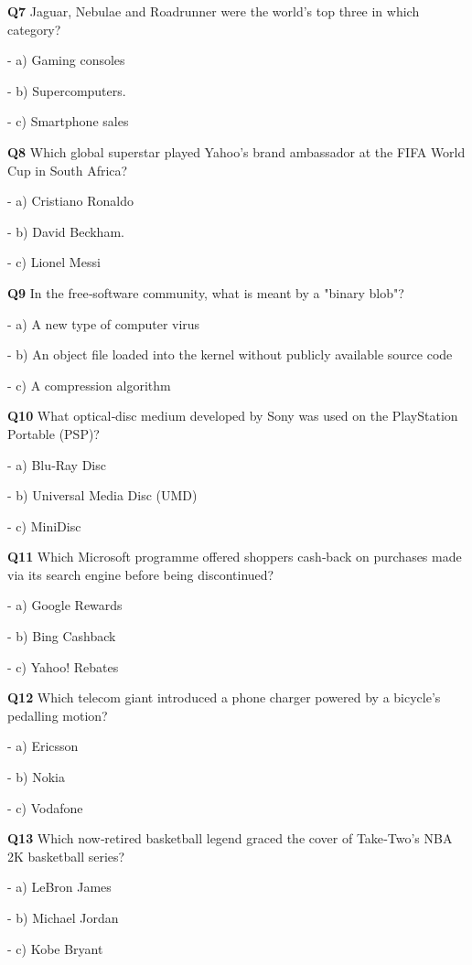 \textbf{Q7} Jaguar, Nebulae and Roadrunner were the world's top three in which category?\par
\quad - a) Gaming consoles\par
\quad - b) Supercomputers.\par
\quad - c) Smartphone sales\par

\textbf{Q8} Which global superstar played Yahoo's brand ambassador at the FIFA World Cup in South Africa?\par
\quad - a) Cristiano Ronaldo\par
\quad - b) David Beckham.\par
\quad - c) Lionel Messi\par

\textbf{Q9} In the free‑software community, what is meant by a "binary blob"?\par
\quad - a) A new type of computer virus\par
\quad - b) An object file loaded into the kernel without publicly available source code\par
\quad - c) A compression algorithm\par

\textbf{Q10} What optical‑disc medium developed by Sony was used on the PlayStation Portable (PSP)?\par
\quad - a) Blu‑Ray Disc\par
\quad - b) Universal Media Disc (UMD)\par
\quad - c) MiniDisc\par

\textbf{Q11} Which Microsoft programme offered shoppers cash‑back on purchases made via its search engine before being discontinued?\par
\quad - a) Google Rewards\par
\quad - b) Bing Cashback\par
\quad - c) Yahoo! Rebates\par

\textbf{Q12} Which telecom giant introduced a phone charger powered by a bicycle's pedalling motion?\par
\quad - a) Ericsson\par
\quad - b) Nokia\par
\quad - c) Vodafone\par

\textbf{Q13} Which now‑retired basketball legend graced the cover of Take‑Two's NBA 2K basketball series?\par
\quad - a) LeBron James\par
\quad - b) Michael Jordan\par
\quad - c) Kobe Bryant\par

